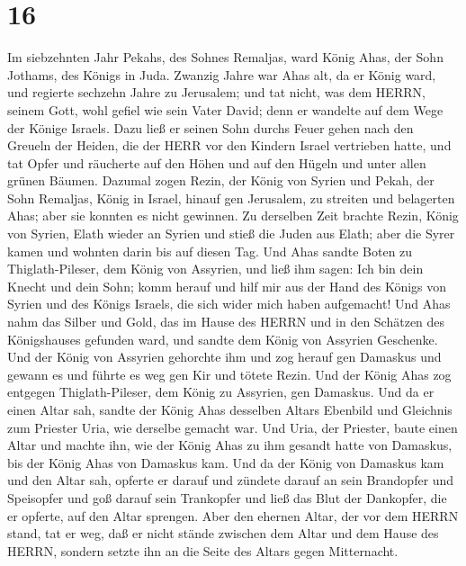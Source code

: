 \hypertarget{section-15}{%
\section{16}\label{section-15}}

 Im siebzehnten Jahr Pekahs, des Sohnes Remaljas, ward König
Ahas, der Sohn Jothams, des Königs in Juda.  Zwanzig Jahre
war Ahas alt, da er König ward, und regierte sechzehn Jahre zu
Jerusalem; und tat nicht, was dem HERRN, seinem Gott, wohl gefiel wie
sein Vater David;  denn er wandelte auf dem Wege der Könige
Israels. Dazu ließ er seinen Sohn durchs Feuer gehen nach den Greueln
der Heiden, die der HERR vor den Kindern Israel vertrieben hatte,
 und tat Opfer und räucherte auf den Höhen und auf den
Hügeln und unter allen grünen Bäumen.  Dazumal zogen Rezin,
der König von Syrien und Pekah, der Sohn Remaljas, König in Israel,
hinauf gen Jerusalem, zu streiten und belagerten Ahas; aber sie konnten
es nicht gewinnen.  Zu derselben Zeit brachte Rezin, König
von Syrien, Elath wieder an Syrien und stieß die Juden aus Elath; aber
die Syrer kamen und wohnten darin bis auf diesen Tag.  Und
Ahas sandte Boten zu Thiglath-Pileser, dem König von Assyrien, und ließ
ihm sagen: Ich bin dein Knecht und dein Sohn; komm herauf und hilf mir
aus der Hand des Königs von Syrien und des Königs Israels, die sich
wider mich haben aufgemacht!  Und Ahas nahm das Silber und
Gold, das im Hause des HERRN und in den Schätzen des Königshauses
gefunden ward, und sandte dem König von Assyrien Geschenke. 
Und der König von Assyrien gehorchte ihm und zog herauf gen Damaskus und
gewann es und führte es weg gen Kir und tötete Rezin.  Und
der König Ahas zog entgegen Thiglath-Pileser, dem König zu Assyrien, gen
Damaskus. Und da er einen Altar sah, sandte der König Ahas desselben
Altars Ebenbild und Gleichnis zum Priester Uria, wie derselbe gemacht
war.  Und Uria, der Priester, baute einen Altar und machte
ihn, wie der König Ahas zu ihm gesandt hatte von Damaskus, bis der König
Ahas von Damaskus kam.  Und da der König von Damaskus kam
und den Altar sah, opferte er darauf  und zündete darauf an
sein Brandopfer und Speisopfer und goß darauf sein Trankopfer und ließ
das Blut der Dankopfer, die er opferte, auf den Altar sprengen.
 Aber den ehernen Altar, der vor dem HERRN stand, tat er
weg, daß er nicht stände zwischen dem Altar und dem Hause des HERRN,
sondern setzte ihn an die Seite des Altars gegen Mitternacht.
